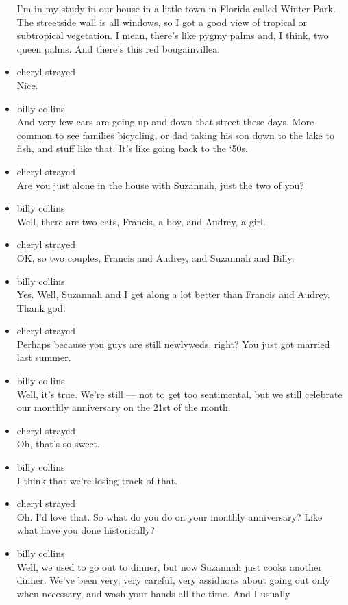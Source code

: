 \begin{itemize}
  I'm in my study in our house in a little town in Florida called Winter
  Park. The streetside wall is all windows, so I got a good view of
  tropical or subtropical vegetation. I mean, there's like pygmy palms
  and, I think, two queen palms. And there's this red bougainvillea.
\item
  cheryl strayed\\
  Nice.
\item
  billy collins\\
  And very few cars are going up and down that street these days. More
  common to see families bicycling, or dad taking his son down to the
  lake to fish, and stuff like that. It's like going back to the `50s.
\item
  cheryl strayed\\
  Are you just alone in the house with Suzannah, just the two of you?
\item
  billy collins\\
  Well, there are two cats, Francis, a boy, and Audrey, a girl.
\item
  cheryl strayed\\
  OK, so two couples, Francis and Audrey, and Suzannah and Billy.
\item
  billy collins\\
  Yes. Well, Suzannah and I get along a lot better than Francis and
  Audrey. Thank god.
\item
  cheryl strayed\\
  Perhaps because you guys are still newlyweds, right? You just got
  married last summer.
\item
  billy collins\\
  Well, it's true. We're still --- not to get too sentimental, but we
  still celebrate our monthly anniversary on the 21st of the month.
\item
  cheryl strayed\\
  Oh, that's so sweet.
\item
  billy collins\\
  I think that we're losing track of that.
\item
  cheryl strayed\\
  Oh. I'd love that. So what do you do on your monthly anniversary? Like
  what have you done historically?
\item
  billy collins\\
  Well, we used to go out to dinner, but now Suzannah just cooks another
  dinner. We've been very, very careful, very assiduous about going out
  only when necessary, and wash your hands all the time. And I usually

\end{itemize}
